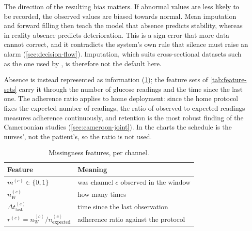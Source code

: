 The direction of the resulting bias matters. If abnormal values are less likely to be recorded, the observed values are biased towards normal. Mean imputation and forward filling then teach the model that absence predicts stability, whereas in reality absence predicts deterioration. This is a sign error that more data cannot correct, and it contradicts the system's own rule that silence must raise an alarm (\cref{sec:decision-flow}). Imputation, which suits cross-sectional datasets such as the one used by \textcite{chatrati2022}, is therefore not the default here.

Absence is instead represented as information (\cref{tab:mask-features}); the feature sets of \cref{tab:feature-sets} carry it through the number of glucose readings and the time since the last one. The adherence ratio applies to home deployment: since the home protocol fixes the expected number of readings, the ratio of observed to expected readings measures adherence continuously, and retention is the most robust finding of the Cameroonian studies (\cref{sec:cameroon-joint}). In the charts the schedule is the nurses', not the patient's, so the ratio is not used.

\begin{table}[htbp]
\centering\small
\caption{Missingness features, per channel.}\label{tab:mask-features}
\begin{tabularx}{\textwidth}{@{}>{\raggedright\arraybackslash}p{4.4cm} X@{}}
\toprule
\textbf{Feature} & \textbf{Meaning} \\
\midrule
$m^{(c)} \in \{0,1\}$ & was channel $c$ observed in the window \\
$n^{(c)}_W$ & how many times \\
$\Delta t^{(c)}_{\text{last}}$ & time since the last observation \\
$r^{(c)} = n^{(c)}_W / n^{(c)}_{\text{expected}}$ & adherence ratio against the protocol \\
\bottomrule
\end{tabularx}
\end{table}

